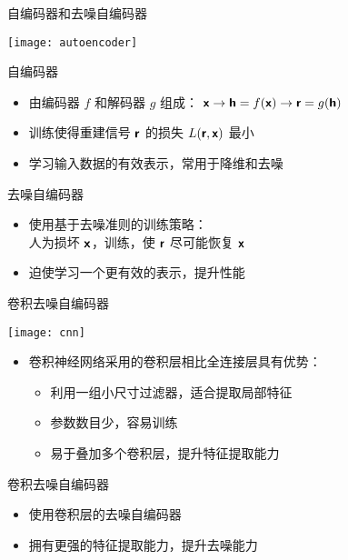 \documentclass{beamer}
\begin{document}
\begin{frame}[t]
  \begin{alertblock}{自编码器和去噪自编码器}
  \end{alertblock}
  \begin{center}
    \texttt{[image: autoencoder]}
  \end{center}
  \vspace{-1ex}
  \begin{alertblock}{自编码器}
    \vspace{-1ex}
    \begin{itemize}
      \item 由编码器 $f$ 和解码器 $g$ 组成：
        $\bm{\mathsf{x}} \rightarrow \bm{\mathsf{h}} = f(\bm{\mathsf{x}}) \rightarrow \bm{\mathsf{r}} = g(\bm{\mathsf{h}})$
      \item 训练使得重建信号 $\bm{\mathsf{r}}$ 的损失 $L(\bm{\mathsf{r}}, \bm{\mathsf{x}})$ 最小
      \item 学习输入数据的有效表示，常用于降维和去噪
    \end{itemize}
  \end{alertblock}
  \begin{alertblock}{去噪自编码器}
    \vspace{-1ex}
    \begin{itemize}
      \item 使用基于\alert{去噪准则}的训练策略：\\
        人为损坏 $\bm{\mathsf{x}}$，训练，使 $\bm{\mathsf{r}}$ 尽可能恢复 $\bm{\mathsf{x}}$
      \item 迫使学习一个更有效的表示，提升性能
    \end{itemize}
  \end{alertblock}
\end{frame}

\begin{frame}[t]
  \begin{alertblock}{卷积去噪自编码器}
  \end{alertblock}
  \begin{center}
    \texttt{[image: cnn]}
  \end{center}
  \vspace{-1ex}
  \begin{itemize}
    \item 卷积神经网络采用的\alert{卷积层}相比\alert{全连接层}具有优势：
      \begin{itemize}
        \item 利用一组小尺寸过滤器，适合提取局部特征
        \item 参数数目少，容易训练
        \item 易于叠加多个卷积层，提升特征提取能力
      \end{itemize}
  \end{itemize}
  \begin{alertblock}{卷积去噪自编码器}
    \vspace{-1ex}
    \begin{itemize}
      \item 使用卷积层的去噪自编码器
      \item 拥有更强的特征提取能力，提升去噪能力
    \end{itemize}
  \end{alertblock}
\end{frame}
\end{document}
